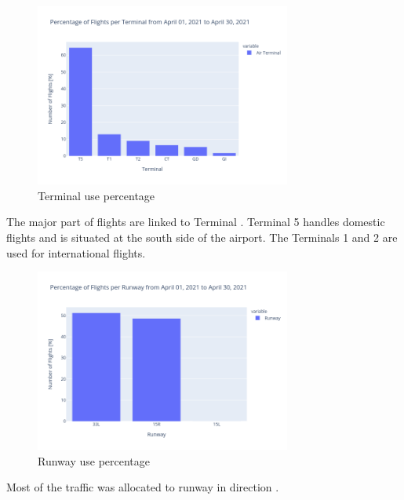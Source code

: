 \documentclass[12pt, oneside]{book}
\begin{document}
{\begin{figure}[H]
\centering
\includegraphics[width=0.75\textwidth, keepaspectratio]{image7}
\caption{Terminal use percentage}\label{image7}
\end{figure}}{}


The major part of flights are linked to Terminal \maxTerminal . Terminal 5 handles domestic flights and is situated at the south side of the airport. The Terminals 1 and 2 are used for international flights.


{\begin{figure}[H]
\centering
\includegraphics[width=0.75\textwidth, keepaspectratio]{image8}
\caption{Runway use percentage}\label{image8}
\end{figure}}{}

Most of the traffic was allocated to runway in direction \maxRunway.
\end{document}
